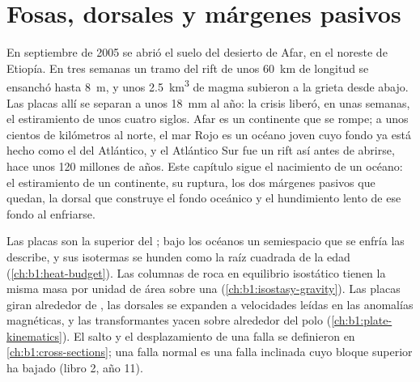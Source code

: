\chapter{Fosas, dorsales y márgenes pasivos}\label{ch:b1:rifts-ridges-margins}

En septiembre de 2005 se abrió el suelo del desierto de Afar, en el noreste de Etiopía. En tres semanas un tramo del rift de unos
\qty{60}{km} de longitud se ensanchó hasta \qty{8}{m}, y unos \qty{2.5}{km^3} de magma subieron a la grieta desde abajo. Las placas allí
se separan a unos \qty{18}{mm} al año: la crisis liberó, en unas semanas, el estiramiento de unos cuatro siglos. Afar es un continente
que se rompe; a unos cientos de kilómetros al norte, el mar Rojo es un océano joven cuyo fondo ya está hecho como el del Atlántico, y el
Atlántico Sur fue un rift así antes de abrirse, hace unos 120 millones de años. Este capítulo sigue el nacimiento de un océano: el
estiramiento de un continente, su ruptura, los dos márgenes pasivos que quedan, la dorsal que construye el fondo oceánico y el hundimiento
lento de ese fondo al enfriarse.

\begin{recall}
Las placas son la  superior del ; bajo los océanos un semiespacio que se enfría las describe, y sus isotermas se
hunden como la raíz cuadrada de la edad (\cref{ch:b1:heat-budget}). Las columnas de roca en equilibrio isostático tienen la misma masa por
unidad de área sobre una  (\cref{ch:b1:isostasy-gravity}). Las placas giran alrededor de , las
dorsales se expanden a velocidades leídas en las anomalías magnéticas, y las transformantes yacen sobre  alrededor del polo
(\cref{ch:b1:plate-kinematics}). El salto y el desplazamiento de una falla se definieron en \cref{ch:b1:cross-sections}; una falla normal es
una falla inclinada cuyo bloque superior ha bajado (libro 2, año 11).
\end{recall}

